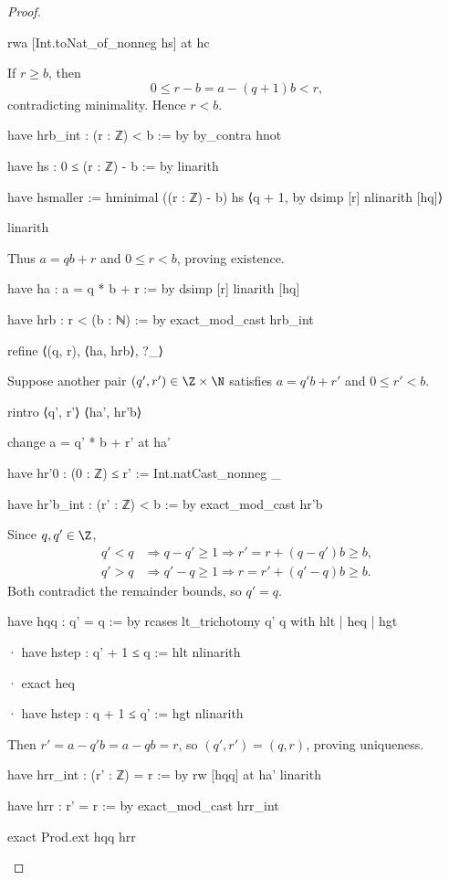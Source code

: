 \begin{proof}
\begin{lean}
      rwa [Int.toNat_of_nonneg hs] at hc
  \end{lean}

  If $r\ge b$, then
  \[
    0\le r-b=a-(q+1)b<r,
  \]
  contradicting minimality. Hence $r<b$.

  \begin{lean}
    have hrb_int : (r : ℤ) < b := by
      by_contra hnot

      have hs : 0 ≤ (r : ℤ) - b := by
        linarith

      have hsmaller := hminimal ((r : ℤ) - b) hs ⟨q + 1, by
        dsimp [r]
        nlinarith [hq]⟩

      linarith
  \end{lean}

  Thus $a=qb+r$ and $0\le r<b$, proving existence.

  \begin{lean}
    have ha : a = q * b + r := by
      dsimp [r]
      linarith [hq]

    have hrb : r < (b : ℕ) := by
      exact_mod_cast hrb_int

    refine ⟨(q, r), ⟨ha, hrb⟩, ?_⟩
  \end{lean}

  Suppose another pair $(q',r')\in\Z\times\N$ satisfies
  $a=q'b+r'$ and $0\le r'<b$.

  \begin{lean}
    rintro ⟨q', r'⟩ ⟨ha', hr'b⟩

    change a = q' * b + r' at ha'

    have hr'0 : (0 : ℤ) ≤ r' := Int.natCast_nonneg _

    have hr'b_int : (r' : ℤ) < b := by
      exact_mod_cast hr'b
  \end{lean}

  Since $q,q'\in\Z$,
  \[
    \begin{aligned}
      q'<q & \Longrightarrow q-q'\ge1
      \Longrightarrow r'=r+(q-q')b\ge b, \\
      q'>q & \Longrightarrow q'-q\ge1
      \Longrightarrow r=r'+(q'-q)b\ge b.
    \end{aligned}
  \]
  Both contradict the remainder bounds, so $q'=q$.

  \begin{lean}
    have hqq : q' = q := by
      rcases lt_trichotomy q' q with hlt | heq | hgt

      · have hstep : q' + 1 ≤ q := hlt
        nlinarith

      · exact heq

      · have hstep : q + 1 ≤ q' := hgt
        nlinarith
  \end{lean}

  Then $r'=a-q'b=a-qb=r$, so $(q',r')=(q,r)$, proving uniqueness.

  \begin{lean}
    have hrr_int : (r' : ℤ) = r := by
      rw [hqq] at ha'
      linarith

    have hrr : r' = r := by
      exact_mod_cast hrr_int

    exact Prod.ext hqq hrr
  \end{lean}
\end{proof}
